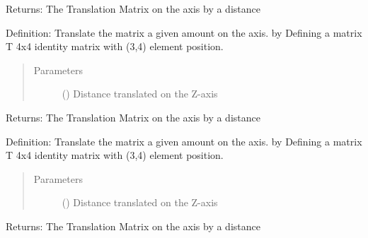 \documentclass[letterpaper,10pt,english,openany,oneside]{sphinxmanual}
\begin{document}
\begin{fulllineitems}
\begin{fulllineitems}
\begin{quote}
\begin{description}
\end{description}\end{quote}

Returns: The Translation Matrix on the  axis by a distance 

\end{fulllineitems}


\begin{fulllineitems}
\label{\detokenize{MatrixManipulation:MatrixManipulation.Matrix.trans_y}}
Definition: Translate the matrix a given amount  on the  axis. by Defining a matrix T 4x4 identity
matrix with  (3,4) element position.
\begin{quote}\begin{description}
\item[{Parameters}] \leavevmode
{} () \textendash{} Distance translated on the Z-axis

\end{description}\end{quote}

Returns: The Translation Matrix on the  axis by a distance 

\end{fulllineitems}


\begin{fulllineitems}
\label{\detokenize{MatrixManipulation:MatrixManipulation.Matrix.trans_z}}
Definition: Translate the matrix a given amount  on the  axis. by Defining a matrix T 4x4 identity
matrix with  (3,4) element position.
\begin{quote}\begin{description}
\item[{Parameters}] \leavevmode
{} () \textendash{} Distance translated on the Z-axis

\end{description}\end{quote}

Returns: The Translation Matrix on the  axis by a distance 

\end{fulllineitems}


\end{fulllineitems}
\end{document}
